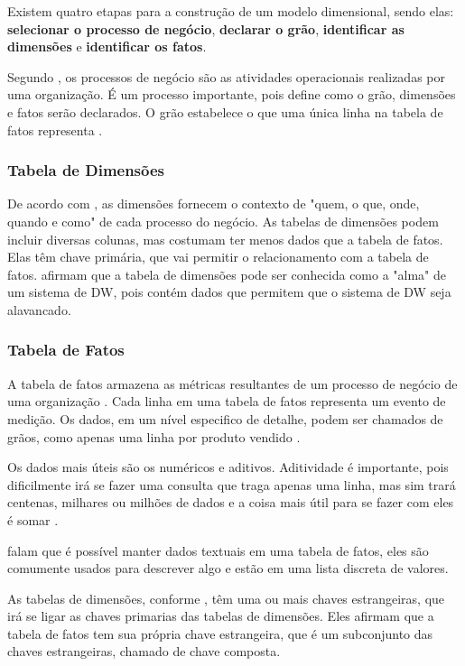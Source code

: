 Existem quatro etapas para a construção de um modelo dimensional, sendo elas: \textbf{selecionar o processo de negócio}, \textbf{declarar o grão}, \textbf{identificar as dimensões} e \textbf{identificar os fatos}. 

Segundo , os processos de negócio são as atividades operacionais realizadas por uma organização. É um processo importante, pois define como o grão, dimensões e fatos serão declarados. O grão estabelece o que uma única linha na tabela de fatos representa \citep{kimball2013}.

\subsubsection{Tabela de Dimensões}
De acordo com , as dimensões fornecem o contexto de "quem, o que, onde, quando e como" de cada processo do negócio. As tabelas de dimensões podem incluir diversas colunas, mas costumam ter menos dados que a tabela de fatos. Elas têm chave primária, que vai permitir o relacionamento com a tabela de fatos.
 afirmam que a tabela de dimensões pode ser conhecida como a "alma" de um sistema de DW, pois contém dados que permitem que o sistema de DW seja alavancado.

\subsubsection{Tabela de Fatos}
A tabela de fatos armazena as métricas resultantes de um processo de negócio de uma organização . Cada linha em uma tabela de fatos representa um evento de medição. Os dados, em um nível especifico de detalhe, podem ser chamados de grãos, como apenas uma linha por produto vendido \citep{kimball2013}.

Os dados mais úteis são os numéricos e aditivos. Aditividade é importante, pois dificilmente irá se fazer uma consulta que traga apenas uma linha, mas sim trará centenas, milhares ou milhões de dados e a coisa mais útil para se fazer com eles é somar \citep{kimball2013}.

 falam que é possível manter dados textuais em uma tabela de fatos, eles são comumente usados para descrever algo e estão em uma lista discreta de valores. 

As tabelas de dimensões, conforme , têm uma ou mais chaves estrangeiras, que irá se ligar as chaves primarias das tabelas de dimensões. Eles afirmam que a tabela de fatos tem sua própria chave estrangeira, que é um subconjunto das chaves estrangeiras, chamado de chave composta. 

